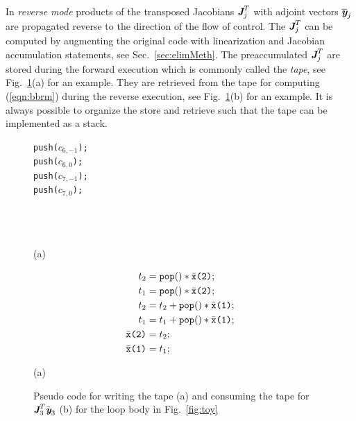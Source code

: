 \documentclass{book}
\newcommand{\bmJ}{\mbox{\bf\em J}}
\newcommand{\bmy}{\mbox{\bf\em y}}
\newcommand{\refsec}[1]{{Sec.~\ref{#1}}}
\newcommand{\reffig}[1]{{Fig.~\ref{#1}}}
\newcommand{\refeqn}[1]{{(\ref{#1})}}
\begin{document}
In {\em reverse mode} products of the transposed
Jacobians $\bmJ^T_j$ with adjoint vectors $\overline{\bmy}_j$
are propagated reverse to the direction of the flow of control.
The $\bmJ^T_j$ can be computed by augmenting the original code with 
linearization and Jacobian accumulation statements, see \refsec{sec:elimMeth}.
The preaccumulated  $\bmJ^T_j$ are stored during the forward execution
which is commonly called the {\em tape}, see \reffig{fig:toyPreaccRev}(a) for an 
example. They are retrieved from the 
tape for computing \refeqn{eqn:bbrm} during the reverse execution, see \reffig{fig:toyPreaccRev}(b) for 
an example. 
It is always possible to organize the store and retrieve such that the tape can be 
implemented as a stack.
\begin{figure}[h]
  \begin{center}
    \begin{minipage}[b]{.2\linewidth}
      \lstinline{push(}$c_{6,-1}$\lstinline{);}\\
      \lstinline{push(}$c_{6,0}$\lstinline{);}\\
      \lstinline{push(}$c_{7,-1}$\lstinline{);}\\
      \lstinline{push(}$c_{7,0}$\lstinline{);}\\
      \\ \\ \\
      \centerline{(a)}
    \end{minipage}
    \begin{minipage}[b]{.2\linewidth}
      \small
      \begin{align*}
        t_2&={\tt pop()}*\bar{\tt x}\mbox{\tt (2)};\\
        t_1&={\tt pop()}*\bar{\tt x}\mbox{\tt (2)};\\
        t_2&=t_2+{\tt pop()}*\bar{\tt x}\mbox{\tt (1)};\\
        t_1&=t_1+{\tt pop()}*\bar{\tt x}\mbox{\tt (1)};\\
        \bar{\tt x}\mbox{\tt (2)}& =t_2;\\
        \bar{\tt x}\mbox{\tt (1)}& =t_1;
      \end{align*}
      \centerline{(a)}
    \end{minipage}
  \end{center}	
  \caption{Pseudo code for writing the tape (a) and consuming the tape for  $\bmJ_3^T\bar{\bmy}_3$ (b) for  the loop body in \reffig{fig:toy}}\label{fig:toyPreaccRev}
\end{figure}
\end{document}
